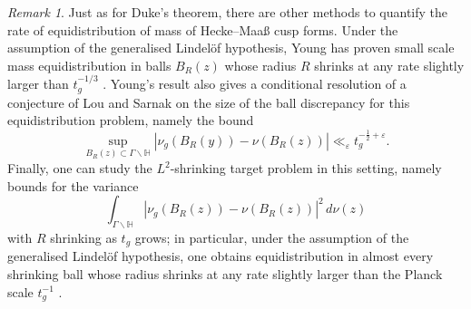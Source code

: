 \documentclass[11pt,a4paper]{amsart}
\newcommand{\e}{\varepsilon}
\newcommand{\Hb}{\mathbb{H}}
\numberwithin{equation}{section}
\theoremstyle{remark}
\newtheorem{remark}[equation]{Remark}
\theoremstyle{definition}
\begin{document}
\begin{remark}
Just as for Duke's theorem, there are other methods to quantify the rate of equidistribution of mass of Hecke--Maa\ss{} cusp forms. Under the assumption of the generalised Lindel\"{o}f hypothesis, Young has proven small scale mass equidistribution in balls $B_R(z)$ whose radius $R$ shrinks at any rate slightly larger than $t_g^{-1/3}$ \cite[Proposition 1.5]{You16}. Young's result also gives a conditional resolution of a conjecture of Lou and Sarnak \cite[p.\ 210]{LS95} on the size of the ball discrepancy for this equidistribution problem, namely the bound
\[\sup_{B_R(z) \subset \Gamma \backslash \Hb} \left|\nu_g(B_R(y)) - \nu(B_R(z))\right| \ll_{\e} t_g^{-\frac{1}{2} + \e}.\]
Finally, one can study the $L^2$-shrinking target problem in this setting, namely bounds for the variance
\[\int_{\Gamma \backslash \Hb} \left|\nu_g(B_R(z)) - \nu(B_R(z))\right|^2 \, d\nu(z)\]
with $R$ shrinking as $t_g$ grows; in particular, under the assumption of the generalised Lindel\"{o}f hypothesis, one obtains equidistribution in almost every shrinking ball whose radius shrinks at any rate slightly larger than the Planck scale $t_g^{-1}$ \cite[Theorem 1.17]{Hum18}.
\end{remark}
\end{document}
